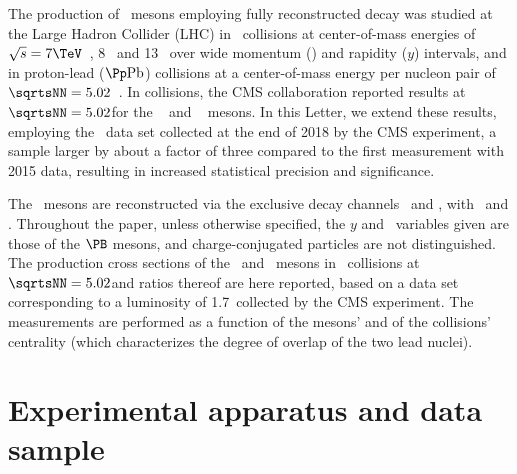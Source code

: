 \documentclass[11pt,twoside,a4paper,cmspaper]{cms-tdr}
\begin{document}
The production of \PB\ mesons employing fully reconstructed decay was studied at the Large Hadron Collider (LHC) in \pp\ collisions at center-of-mass energies of $\sqrts = 7\TeV$~\cite{CMSBmesonpp,Chatrchyan:2011pw,Chatrchyan:2011vh,ATLAS:2013cia,LHCb:2013JHEP,Aaij:2014hla,Aaij:2012dd}, 8\TeV~\cite{Aaij:2015fea,Aaij:2014ija} and 13\TeV~\cite{Khachatryan:2016csy} over wide momentum (\pt) and rapidity ($y$) intervals, and in proton-lead ($\pPb$) collisions at a center-of-mass energy per nucleon pair of $\sqrtsNN = 5.02$\TeV~\cite{Khachatryan:2015uja}. In \PbPb collisions, the CMS collaboration reported results at $\sqrtsNN = 5.02$\TeV for the \PBp~\cite{BpPbPbCMS} and \PBzs~\cite{BsPbPbCMS} mesons.
%
In this Letter, we extend these results, employing the \PbPb\ data set collected at the end of 2018 by the CMS experiment, a sample larger by about a factor of three compared to the first measurement with 2015 data, resulting in increased statistical precision and significance.  

The \PB\ mesons are reconstructed via the exclusive decay channels \Bzerosdecay\ and \Bplusdecay, with \Jpsidecay\ and \phidecay.
Throughout the paper, unless otherwise specified, the $y$ and \pt\ variables given are those of the $\PB$ mesons, and charge-conjugated particles are not distinguished. The production cross sections of the \PBzs\ and \PBp\ mesons in \PbPb\ collisions at $\sqrtsNN = 5.02$\TeV and ratios thereof are here reported, based on a data set corresponding to a luminosity of 1.7\nbinv\ collected by the CMS experiment.
The measurements are performed as a function of the mesons' \pt and of the \PbPb collisions' centrality (which characterizes the degree of overlap of the two lead nuclei).

\section{Experimental apparatus and data sample}
\end{document}
